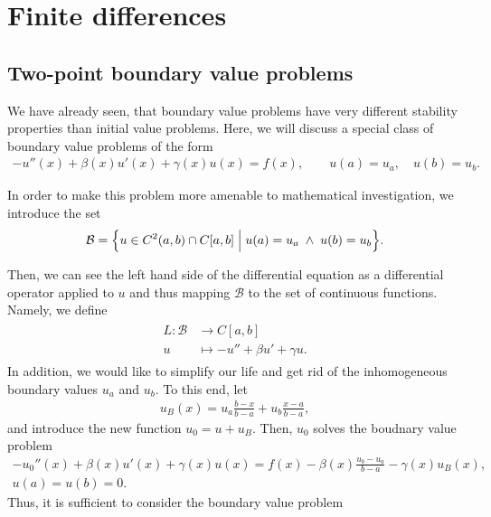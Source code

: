 \chapter{Finite differences}

\section{Two-point boundary value problems}

\begin{intro}
  We have already seen, that boundary value problems have very
  different stability properties than initial value
  problems. Here, we will discuss a special class of boundary value
  problems of the form
  \begin{gather}
    \label{eq:bvp-second:1}
    -u''(x) + \beta(x) u'(x) + \gamma(x)u(x) = f(x),
    \qquad u(a) = u_a,
    \quad u(b) = u_b.
  \end{gather}

  In order to make this problem more amenable to mathematical
  investigation, we introduce the set
  \begin{gather*}
    \mathcal B =
    \Bigl\{ u\in C^2(a,b) \cap C[a,b]
    \;\Big|\; u(a) = u_a\;\wedge\; u(b) = u_b
    \Bigr\}.
  \end{gather*}

  Then, we can see the left hand side of the differential equation as
  a differential operator applied to $u$ and thus mapping $\mathcal B$
  to the set of continuous functions. Namely, we define
  \begin{gather}
    \label{eq:fd:2}
    \begin{split}
      L: \mathcal B &\to C[a,b] \\
      u & \mapsto -u'' + \beta u' + \gamma u.
    \end{split}
  \end{gather}
  In addition, we would like to simplify our life and get rid of the
  inhomogeneous boundary values $u_a$ and $u_b$. To this end, let
  \begin{gather*}
    u_B(x) = u_a \frac{b-x}{b-a} + u_b \frac{x-a}{b-a},
  \end{gather*}
  and introduce the new function $u_0 = u+u_B$. Then, $u_0$ solves
  the boudnary value problem
  \begin{multline*}
    -u_0''(x) + \beta(x) u'(x) + \gamma(x)u(x) = f(x) -
    \beta(x)\frac{u_b-u_a}{b-a} - \gamma(x)u_B(x),
    \\ u(a) =  u(b) = 0.
  \end{multline*}
  Thus, it is sufficient to consider the boundary value problem
\end{intro}

